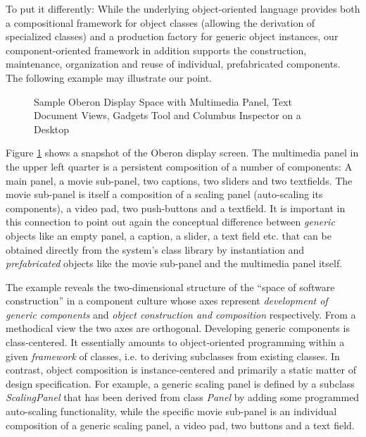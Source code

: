 \ein
To put it differently: While the underlying object-oriented language provides
both a compositional framework for object classes (allowing the derivation
of specialized classes) and a production factory for generic object instances,
our component-oriented framework in addition supports the construction,
maintenance, organization and reuse of individual, prefabricated components.
The following example may illustrate our point.

\begin{figure}[ht]
\begin{center}
\leavevmode
\epsfxsize=12.0cm
\epsfysize=8.45cm
\caption{Sample Oberon Display Space with Multimedia Panel,
         Text Document Views, Gadgets Tool and Columbus Inspector on a
Desktop}
\label{fig1}
\end{center}
\end{figure}

\ein
Figure \ref{fig1} shows a snapshot of the Oberon display screen. The
multimedia
panel in the upper left quarter is a persistent composition of a number of
components: A main panel, a movie sub-panel, two captions, two sliders and
two textfields. The movie sub-panel is itself a composition of a scaling panel
(auto-scaling its components), a video pad, two push-buttons and a textfield.
It is important in this connection to point out again the conceptual
difference
between {\em generic\/} objects like an empty panel, a caption, a slider,
a text field etc. that can be obtained directly from the system's class
library
by instantiation and {\em prefabricated\/} objects like the movie sub-panel
and the multimedia panel itself.

\ein
The example reveals the two-dimensional structure of the ``space of software
construction'' in a component culture whose axes represent {\em development
of generic components\/} and {\em object construction and composition\/}
respectively. From a methodical view the two axes are orthogonal.
Developing generic components
is class-centered. It essentially amounts to object-oriented programming
within
a given {\em framework} of classes, i.e. to deriving subclasses from existing
classes. In contrast, object composition is instance-centered and primarily
a static matter of design specification.
For example, a generic scaling panel is defined by a subclass {\em
ScalingPanel\/} that has been derived from class {\em Panel\/} by adding
some programmed auto-scaling functionality, while the specific movie
sub-panel is an individual composition of a generic scaling panel, a video
pad,
two buttons and a text field.

